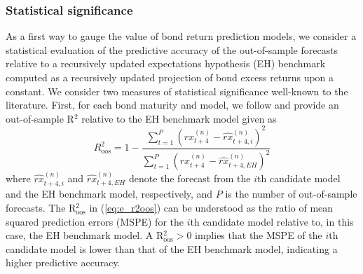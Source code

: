 \documentclass[12pt,letterpaper,leqno,doublespacing]{article}
\begin{document}

\subsubsection{Statistical significance}\label{Sec:e_statistical_evaluation}
As a first way to gauge the value of bond return prediction models, we consider a statistical evaluation of the predictive accuracy of the out-of-sample forecasts relative to a recursively updated expectations hypothesis (EH) benchmark computed as a recursively updated projection of bond excess returns upon a constant. We consider two measures of statistical significance well-known to the literature. First, for each bond maturity and model, we follow \cite{CampbellThompson2008} and provide an out-of-sample R$^{2}$ relative to the EH benchmark model given as 
\begin{equation}
    R^{2}_{\text{oos}} = 1 - \frac{\sum_{t=1}^{P}\left(rx_{t+4}^{\left(n\right)} - \widehat{rx}_{t+4,i}^{\left(n\right)}\right)^{2}}{\sum_{t=1}^{P}\left(rx_{t+4}^{\left(n\right)} - \widehat{rx}_{t+4,EH}^{\left(n\right)}\right)^{2}}
    \label{eq:e_r2oos}
\end{equation}
where $\widehat{rx}_{t+4,i}^{\left(n\right)}$ and $\widehat{rx}_{t+4,EH}^{\left(n\right)}$ denote the forecast from the $i$th candidate model and the EH benchmark model, respectively, and $P$ is the number of out-of-sample forecasts. The R$^{2}_{\text{oos}}$ in (\ref{eq:e_r2oos}) can be understood as the ratio of mean squared prediction errors (MSPE) for the $i$th candidate model relative to, in this case, the EH benchmark model. A R$^{2}_{\text{oos}} > 0$ implies that the MSPE of the $i$th candidate model is lower than that of the EH benchmark model, indicating a higher predictive accuracy.
\end{document}
